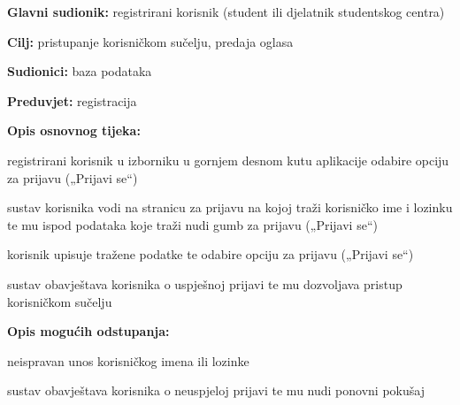 \noindent {}
\begin{packed_item}
	
	\item \textbf{Glavni sudionik: } registrirani korisnik (student ili djelatnik studentskog centra)
	\item  \textbf{Cilj:} pristupanje korisničkom sučelju, predaja oglasa
	\item  \textbf{Sudionici:} baza podataka
	\item  \textbf{Preduvjet:} registracija
	\item  \textbf{Opis osnovnog tijeka:}
	
	\item[] \begin{packed_enum}
		
		\item registrirani korisnik u izborniku u gornjem desnom kutu aplikacije odabire opciju za prijavu („Prijavi se“)
		\item sustav korisnika vodi na stranicu za prijavu na kojoj traži korisničko ime i lozinku te mu ispod podataka koje traži nudi gumb za prijavu („Prijavi se“)
		\item korisnik upisuje tražene podatke te odabire opciju za prijavu („Prijavi se“) 
		\item sustav obavještava korisnika o uspješnoj prijavi te mu dozvoljava pristup korisničkom sučelju
	
		
	\end{packed_enum}
	
	\item  \textbf{Opis mogućih odstupanja:}
	
	\item[] \begin{packed_item}
		
		\item[4.a] neispravan unos korisničkog imena ili  lozinke
		\item[] \begin{packed_enum}
			
			\item sustav obavještava korisnika o neuspjeloj prijavi te mu nudi ponovni pokušaj
			
		\end{packed_enum}

	\end{packed_item}
\end{packed_item}



